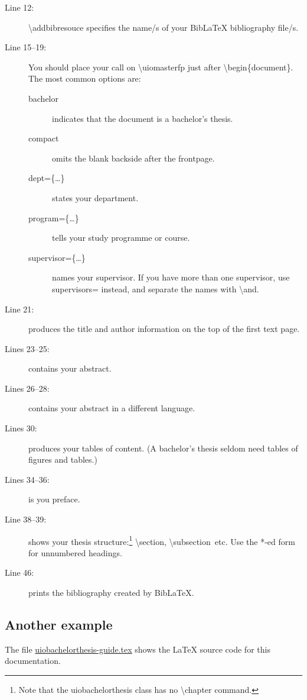 \documentclass[UKenglish]{uiobachelorthesis}
\newcommand{\bsl}{\textbackslash}
\newcommand{\p}[1]{\textsf{#1}}
\newcommand{\pcmd}[1]{\p{\bsl #1}}
\newcommand{\ppar}[1]{\p{\{#1\}}}
\begin{document}
\begin{description}
\item [Line 12:] \pcmd{addbibresouce} specifies the name/s of your Bib\LaTeX{}
  bibliography file/s.

\item[Line 15--19:] You should place your call on \pcmd{uiomasterfp}
  just after \pcmd{begin}\ppar{document}. The most common options are:
  \begin{description}
  \item[\p{bachelor}] indicates that the document is a bachelor's
    thesis.
  \item[\p{compact}] omits the blank backside after the frontpage.
  \item[\p{dept=\ppar{\dots}}] states your department.
  \item[\p{program=\ppar{\dots}}] tells your study programme or course.
  \item[\p{supervisor=\ppar{\dots}}] names your supervisor. If you
    have more than one supervisor, use \p{supervisors=} instead, and
    separate the names with \pcmd{and}.
  \end{description}

\item[Line 21:] produces the title and author information on the top
  of the first text page.
\item[Lines 23--25:] contains your abstract.
\item[Lines 26--28:] contains your abstract in a different language.
\item[Lines 30:] produces your tables of content. (A bachelor's thesis
  seldom need tables of figures and tables.)
\item[Lines 34--36:] is you preface.

\item[Line 38--39:] shows your thesis structure:\footnote{Note that
  the \p{uiobachelorthesis} class has no \pcmd{chapter} command.}
  \pcmd{section}, \pcmd{subsection}~etc.
  Use the *-ed form for unnumbered headings.

\item[Line 46:] prints the bibliography created by Bib\LaTeX.
\end{description}

\subsection{Another example}
The file \url{uiobachelorthesis-guide.tex} shows the \LaTeX{} source
code for this documentation.
\end{document}
